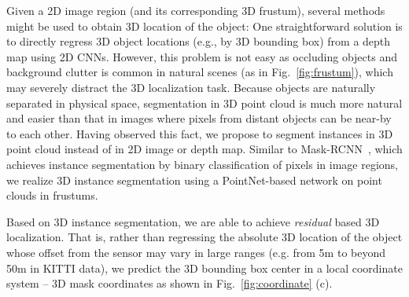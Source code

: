 Given a 2D image region (and its corresponding 3D frustum), several methods might be used to obtain 3D location of the object:
One straightforward solution is to directly regress 3D object locations (e.g., by 3D bounding box) from a depth map using 2D CNNs. However, this problem is not easy as occluding objects and background clutter is common in natural scenes (as in Fig.~\ref{fig:frustum}), which may severely distract the 3D localization task. %
Because objects are naturally separated in physical space, segmentation in 3D point cloud is much more natural and easier than that in images where pixels from distant objects can be near-by to each other. Having observed this fact, we propose to segment instances in 3D point cloud instead of in 2D image or depth map. Similar to Mask-RCNN~\cite{he2017mask}, which achieves instance segmentation by binary classification of pixels in image regions, we realize 3D instance segmentation using a PointNet-based network on point clouds in frustums.

Based on 3D instance segmentation, we are able to achieve \emph{residual} based 3D localization. That is, rather than regressing the absolute 3D location of the object whose offset from the sensor may vary in large ranges (e.g. from 5m to beyond 50m in KITTI data), we predict the 3D bounding box center in a local coordinate system -- 3D mask coordinates as shown in Fig.~\ref{fig:coordinate} (c).


